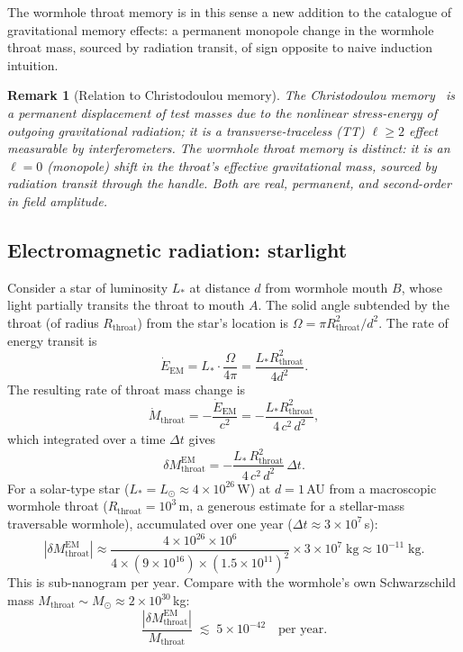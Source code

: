\documentclass[aps,prd,onecolumn,nofootinbib,superscriptaddress]{revtex4-2}
\newtheorem{remark}{Remark}
\begin{document}
The wormhole throat memory is in this sense a new addition to the catalogue of
gravitational memory effects: a permanent monopole change in the wormhole
throat mass, sourced by radiation transit, of sign opposite to naive induction
intuition.

\begin{remark}[Relation to Christodoulou memory]
The Christodoulou memory~\cite{Christodoulou1991Memory} is a permanent
displacement of test masses due to the nonlinear stress-energy of outgoing
gravitational radiation; it is a transverse-traceless (TT) $\ell \ge 2$
effect measurable by interferometers.  The wormhole throat memory is
distinct: it is an $\ell = 0$ (monopole) shift in the throat's effective
gravitational mass, sourced by radiation transit through the handle.  Both
are real, permanent, and second-order in field amplitude.
\end{remark}

\subsection{Electromagnetic radiation: starlight}

Consider a star of luminosity $L_*$ at distance $d$ from wormhole mouth $B$,
whose light partially transits the throat to mouth $A$.  The solid angle
subtended by the throat (of radius $R_{\mathrm{throat}}$) from the star's
location is $\Omega = \pi R_{\mathrm{throat}}^2/d^2$.  The rate of energy
transit is
\begin{equation}
  \dot{E}_{\mathrm{EM}} = L_* \cdot \frac{\Omega}{4\pi}
  = \frac{L_* R_{\mathrm{throat}}^2}{4 d^2}.
\end{equation}
The resulting rate of throat mass change is
\begin{equation}
  \dot{M}_{\mathrm{throat}} = -\frac{\dot{E}_{\mathrm{EM}}}{c^2}
  = -\frac{L_* R_{\mathrm{throat}}^2}{4\, c^2\, d^2},
\end{equation}
which integrated over a time $\Delta t$ gives
\begin{equation}
  \delta M_{\mathrm{throat}}^{\mathrm{EM}}
  = -\frac{L_*\,R_{\mathrm{throat}}^2}{4\,c^2\,d^2}\,\Delta t.
\end{equation}
For a solar-type star ($L_*=L_\odot\approx 4\times 10^{26}$\,W) at
$d=1$\,AU from a macroscopic wormhole throat ($R_{\mathrm{throat}}=10^3$\,m,
a generous estimate for a stellar-mass traversable wormhole), accumulated over
one year ($\Delta t\approx 3\times 10^7$\,s):
\begin{equation}
  |\delta M_{\mathrm{throat}}^{\mathrm{EM}}|
  \approx
  \frac{4\times 10^{26}\times 10^6}{4\times (9\times 10^{16})\times (1.5\times 10^{11})^2}
  \times 3\times 10^7
  \;\mathrm{kg}
  \approx 10^{-11}\;\mathrm{kg}.
\end{equation}
This is sub-nanogram per year.  Compare with the wormhole's own
Schwarzschild mass $M_{\mathrm{throat}}\sim M_\odot\approx 2\times 10^{30}$\,kg:
\begin{equation}
  \frac{|\delta M_{\mathrm{throat}}^{\mathrm{EM}}|}{M_{\mathrm{throat}}}
  \;\lesssim\; 5\times 10^{-42}\quad\text{per year.}
\end{equation}
\end{document}
